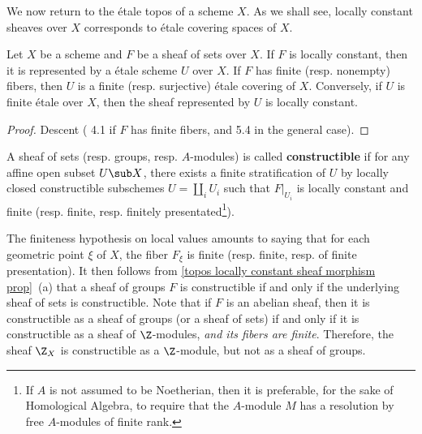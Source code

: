 We now return to the \'etale topos of a scheme $X$. As we shall see,  locally constant sheaves over $X$ corresponds to \'etale covering spaces of $X$.
\begin{proposition}\label{scheme etale locally constant sheaf represented by etale cover}
Let $X$ be a scheme and $F$ be a sheaf of sets over $X$. If $F$ is locally constant, then it is represented by a \'etale scheme $U$ over $X$. If $F$ has finite (resp. nonempty) fibers, then $U$ is a finite (resp. surjective) \'etale covering of $X$. Conversely, if $U$ is finite \'etale over $X$, then the sheaf represented by $U$ is locally constant.
\end{proposition}
\begin{proof}
Descent (\cite{SGA1}  4.1 if $F$ has finite fibers, and \cite{SGA3}  5.4 in the general case).
\end{proof}

\begin{definition}
A sheaf of sets (resp. groups, resp. $A$-modules) is called \textbf{constructible} if for any affine open subset $U\sub X$, there exists a finite stratification of $U$ by locally closed constructible subschemes $U=\coprod_iU_i$ such that $F|_{U_i}$ is locally constant and finite (resp. finite, resp. finitely presentated\footnote{If $A$ is not assumed to be Noetherian, then it is preferable, for the sake of Homological Algebra, to require that the $A$-module $M$ has a resolution by free $A$-modules of finite rank.}).
\end{definition}

The finiteness hypothesis on local values amounts to saying that for each geometric point $\xi$ of $X$, the fiber $F_\xi$ is finite (resp. finite, resp. of finite presentation). It then follows from \cref{topos locally constant sheaf morphism prop}~(a) that a sheaf of groups $F$ is constructible if and only if the underlying sheaf of sets is constructible. Note that if $F$ is an abelian sheaf, then it is constructible as a sheaf of groups (or a sheaf of sets) if and only if it is constructible as a sheaf of $\Z$-modules, \textit{and its fibers are finite}. Therefore, the sheaf $\Z_X$ is constructible as a $\Z$-module, but not as a sheaf of groups.

